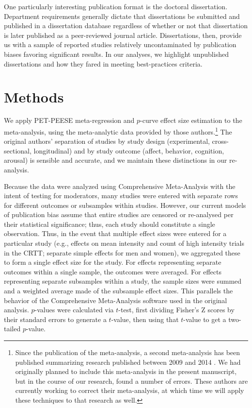 \documentclass[man]{apa6}
\begin{document}
One particularly interesting publication format is the doctoral dissertation. Department requirements generally dictate that dissertations be submitted and published in a dissertation database regardless of whether or not that dissertation is later published as a peer-reviewed journal article. Dissertations, then, provide us with a sample of reported studies relatively uncontaminated by publication biases favoring significant results. In our analyses, we highlight unpublished dissertations and how they fared in meeting best-practices criteria.

\section{Methods}
We apply PET-PEESE meta-regression and $p$-curve effect size estimation to the \citet{Anderson:etal:2010} meta-analysis, using the meta-analytic data provided by those authors.\footnote{Since the publication of the \citet{Anderson:etal:2010} meta-analysis, a second meta-analysis has been published summarizing research published between 2009 and 2014 \citep{Greitemeyer:Mugge:2014}. We had originally planned to include this meta-analysis in the present manuscript, but in the course of our research, found a number of errors. These authors are currently working to correct their meta-analysis, at which time we will apply these techniques to that research as well.} The original authors' separation of studies by study design (experimental, cross-sectional, longitudinal) and by study outcome (affect, behavior, cognition, arousal) is sensible and accurate, and we maintain these distinctions in our re-analysis.

Because the data were analyzed using Comprehensive Meta-Analysis with the intent of testing for moderators, many studies were entered with separate rows for different outcomes or subsamples within studies. However, our current models of publication bias assume that entire studies are censored or re-analysed per their statistical significance; thus, each study should constitute a single observation. Thus, in the event that multiple effect sizes were entered for a particular study (e.g., effects on mean intensity and count of high intensity trials in the CRTT; separate simple effects for men and women), we aggregated these to form a single effect size for the study. For effects representing separate outcomes within a single sample, the outcomes were averaged. For effects representing separate subsamples within a study, the sample sizes were summed and a weighted average made of the subsample effect sizes. This parallels the behavior of the Comprehensive Meta-Analysis software used in the original analysis. $p$-values were calculated via $t$-test, first dividing Fisher's Z scores by their standard errors to generate a $t$-value, then using that $t$-value to get a two-tailed $p$-value.
\end{document}
